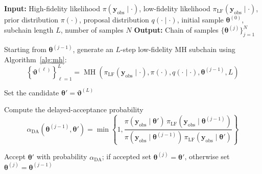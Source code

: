 \documentclass{elsarticle}
\begin{document}
\begin{algorithm}[t]
\caption{Delayed-acceptance MCMC (DA)}
\label{alg:da}
\begin{algorithmic}[1]
\Statex \textbf{Input:}
High-fidelity likelihood $\pi(\mathbf y_{\mathrm{obs}}\mid\cdot)$,
low-fidelity likelihood $\pi_{\mathrm{LF}}(\mathbf y_{\mathrm{obs}}\mid\cdot)$,
prior distribution $\pi(\cdot)$,
proposal distribution $q(\cdot\mid\cdot)$,
initial sample $\boldsymbol{\theta}^{(0)}$,
subchain length $L$,
number of samples $N$
\Statex \textbf{Output:}
Chain of samples $\{\boldsymbol{\theta}^{(j)}\}_{j=1}^N$


    \State Starting from $\boldsymbol{\theta}^{(j-1)}$, generate an
    $L$-step low-fidelity MH subchain using Algorithm~\ref{alg:mh}:
    \begin{equation*}
        \left\{
        \boldsymbol{\vartheta}^{(\ell)}
        \right\}_{\ell=1}^{L}
        =
        \operatorname{MH}\!\left(
        \pi_{\mathrm{LF}}(\mathbf y_{\mathrm{obs}}\mid\cdot),
        \pi(\cdot),
        q(\cdot\mid\cdot),
        \boldsymbol{\theta}^{(j-1)},
        L
        \right)
    \end{equation*}

    \State Set the candidate
    $\boldsymbol{\theta}'=\boldsymbol{\vartheta}^{(L)}$

    \State Compute the delayed-acceptance probability
    \begin{equation*}
    \alpha_{\mathrm{DA}}
    \!\left(
    \boldsymbol{\theta}^{(j-1)},
    \boldsymbol{\theta}'
    \right)
    =
    \min\left\{
    1,
    \frac{
    \pi(
    \mathbf y_{\mathrm{obs}}
    \mid
    \boldsymbol{\theta}'
    )\,
    \pi_{\mathrm{LF}}(
    \mathbf y_{\mathrm{obs}}
    \mid
    \boldsymbol{\theta}^{(j-1)}
    )
    }{
    \pi(
    \mathbf y_{\mathrm{obs}}
    \mid
    \boldsymbol{\theta}^{(j-1)}
    )\,
    \pi_{\mathrm{LF}}(
    \mathbf y_{\mathrm{obs}}
    \mid
    \boldsymbol{\theta}'
    )
    }
    \right\}
    \end{equation*}

    \State Accept $\boldsymbol{\theta}'$ with probability
    $\alpha_{\mathrm{DA}}$; if accepted set
    $\boldsymbol{\theta}^{(j)}=\boldsymbol{\theta}'$,
    otherwise set
    $\boldsymbol{\theta}^{(j)}
    =\boldsymbol{\theta}^{(j-1)}$

\EndFor
\end{algorithmic}
\end{algorithm}
\end{document}
